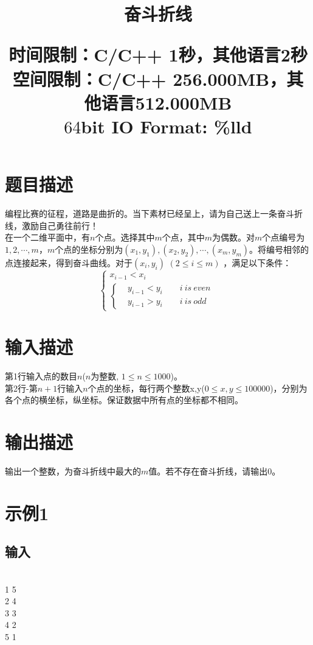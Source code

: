 \documentclass{article}
\date{}
\title{奋斗折线 \\ [2ex] \begin{large} 
	时间限制：C/C++ 1秒，其他语言2秒 \\
	空间限制：C/C++ 256.000MB，其他语言512.000MB 	\\
	$64$bit IO Format: \%lld
 			\end{large} }
\begin{document}
		\maketitle \vspace{-50pt}
		
		\section*{题目描述}
		\indent 编程比赛的征程，道路是曲折的。当下素材已经呈上，请为自己送上一条奋斗折线，激励自己勇往前行！\\
		\indent 在一个二维平面中，有$n$个点。选择其中$m$个点，其中$m$为偶数。对$m$个点编号为$1,2,\cdots,m$，$m$个点的坐标分别为$ (x_{1},y_{1}) , (x_{2},y_{2}) , \cdots , (x_{m},y_{m}) $。将编号相邻的点连接起来，得到奋斗曲线。对于$(x_{i}, y_{i})$ $(2 \le i \le m)$ ，满足以下条件：\\
\begin{equation}\nonumber
	\left\{
	\begin{aligned}
		x_{i-1}<x_{i} \\
		\left\{
		\begin{aligned}
			&y_{i-1}<y_{i} \qquad i \ is \ even \\
			&y_{i-1}>y_{i} \qquad i \ is \ odd
		\end{aligned}
		\right.
	\end{aligned}
	\right.
\end{equation}

		\section*{输入描述}
			\noindent 第1行输入点的数目$n$($n$为整数, $1 \le n \le 1000$)。\\
			第2行-第$n+1$行输入$n$个点的坐标，每行两个整数x,y($0 \le x,y \le 100000$)，分别为各个点的横坐标，纵坐标。保证数据中所有点的坐标都不相同。

		\section*{输出描述}
			\noindent 输出一个整数，为奋斗折线中最大的$m$值。若不存在奋斗折线，请输出$0$。
			
		\section*{示例1}
			\subsection*{输入}
		\\
1 5	\\
2 4	\\
3 3	\\
4 2	\\
5 1
\end{document}
